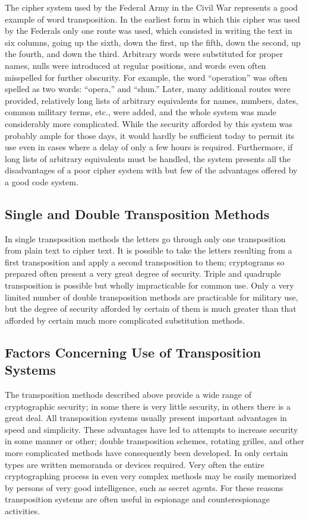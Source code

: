 \mypara The cipher system used by the Federal Army in the Civil War
represents a good example of word transposition. In the earliest form
in which this cipher was used by the Federals only one route was used,
which consisted in writing the text in six columns, going up the sixth,
down the first, up the fifth, down the second, up the fourth, and down
the third. Arbitrary words were substituted for proper names, nulls were
introduced at regular positions, and words even often misspelled for
further obscurity. For example, the word “operation” was often spelled
as two words: “opera,” and “shun.” Later, many additional routes were
provided, relatively long lists of arbitrary equivalents for names, numbers, dates, common military terms, etc., were added, and the whole
system was made considerably more complicated. While the security
afforded by this system was probably ample for those days, it would
hardly be sufficient today to permit its use even in cases where a delay
of only a few hours is required. Furthermore, if long lists of arbitrary
equivalents must be handled, the system presents all the disadvantages of
a poor cipher system with but few of the advantages offered by a good
code system.

\subsection{Single and Double Transposition Methods}

In single transposition methods the letters go through only one transposition from plain text to cipher text. It is possible to take the letters
resulting from a first transposition and apply a second transposition to
them; cryptograms so prepared often present a very great degree of
security. Triple and quadruple transposition is possible but wholly
impracticable for common use. Only a very limited number of double
transposition methods are practicable for military use, but the degree of
security afforded by certain of them is much greater than that afforded
by certain much more complicated substitution methods.

\subsection{Factors Concerning Use of Transposition Systems}

\mypara The transposition methods described above provide a wide range
of cryptographic security; in some there is very little security, in others
there is a great deal. All transposition systems usually present important
advantages in speed and simplicity. These advantages have led to attempts
to increase security in some manner or other; double transposition
schemes, rotating grilles, and other more complicated methods have consequently been developed. In only certain types are written memoranda
or devices required. Very often the entire cryptographing process in even
very complex methods may be easily memorized by persons of very good
intelligence, such as secret agents. For these reasons transposition systems
are often useful in espionage and counterespionage activities.

